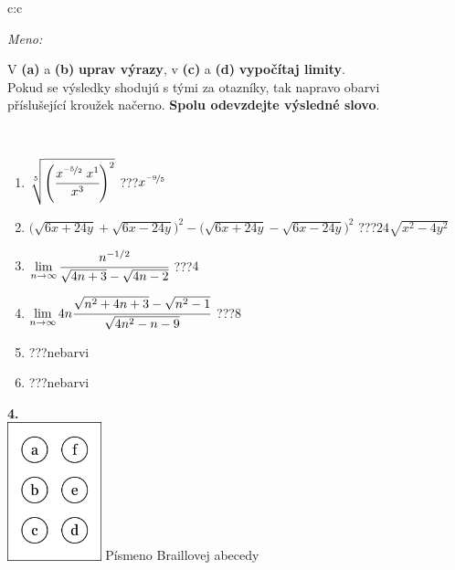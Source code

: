 \documentclass[10pt]{report}
\begin{document}
\begin{tabular}{c:c}
\begin{minipage}[c][104.5mm][t]{0.5\linewidth}
\begin{center}
\textit{Meno:}\phantom{xxxxxxxxxxxxxxxxxxxxxxxxxxxxxxxxxxxxxxxxxxxxxxxxxxxxxxxxxxxxxxxxx}\\[5mm]
\begin{minipage}{0.95\linewidth}
\begin{center}
V \textbf{(a)} a \textbf{(b)} \textbf{uprav výrazy}, v \textbf{(c)} a \textbf{(d)} \textbf{vypočítaj limity}.\\Pokud se výsledky shodujú s tými za otazníky, tak napravo obarvi\\příslušející kroužek načerno. \textbf{Spolu odevzdejte výsledné slovo}.
\end{center}
\end{minipage}
\\[1mm]
\begin{minipage}{0.79\linewidth}
\begin{center}
\begin{varwidth}{\linewidth}
\begin{enumerate}
\small
\item $\sqrt[5]{\left(\cfrac{x^{\nicefrac{-5}{2}}\;x^{1}}{x^{3}}\right)^{2}}$\quad \dotfill\; ???\;\dotfill \quad $x^{\nicefrac{-9}{5}}$
\item {\footnotesize{\scriptsize$\big(\sqrt{6x+24y}+\sqrt{6x-24y}\big)^2-\big(\sqrt{6x+24y}-\sqrt{6x-24y}\big)^2$}\quad \dotfill\; ???\;\dotfill \quad $24\sqrt{x^2-4y^2}$}
\item $\lim\limits_{n\to\infty}\cfrac{n^{-1/2}}{\sqrt{4n+3}-\sqrt{4n-2}}$\quad \dotfill\; ???\;\dotfill \quad $4$
\item $\lim\limits_{n\to\infty}4n\cfrac{\sqrt{n^2+4n+3}-\sqrt{n^2-1}}{\sqrt{4n^2-n-9}}$\quad \dotfill\; ???\;\dotfill \quad $8$
\item \quad \dotfill\; ???\;\dotfill \quad nebarvi
\item \quad \dotfill\; ???\;\dotfill \quad nebarvi
\end{enumerate}
\end{varwidth}
\end{center}
\end{minipage}
\begin{minipage}{0.20\linewidth}
\begin{center}
{\Huge\bfseries 4.} \\[2mm]
\includegraphics[height=40mm]{../images/braille.png}
{\small Písmeno Braillovej abecedy}
\end{center}
\end{minipage}
\end{center}
\end{minipage}
%
\end{tabular}
\end{document}
